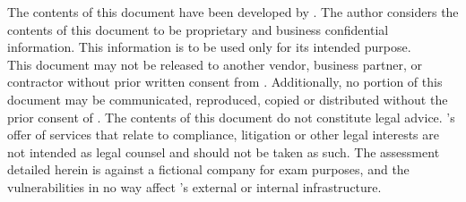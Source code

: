 
{ \tab The contents of this document have been developed by \brandName. The author considers the contents of this
document to be proprietary and business confidential information. This information is to be used only for its intended purpose.\\This document may not be released to another vendor, business partner, or contractor without prior
written consent from \brandName. Additionally, no portion of this document may be communicated, reproduced,
copied or distributed without the prior consent of \brandName.
The contents of this document do not constitute legal advice. \brandName’s offer of services that relate to compliance,
litigation or other legal interests are not intended as legal counsel and should not be taken as such. The assessment
detailed herein is against a fictional company for exam purposes, and the vulnerabilities in no way
affect \enterpriseName's external or internal infrastructure.}

